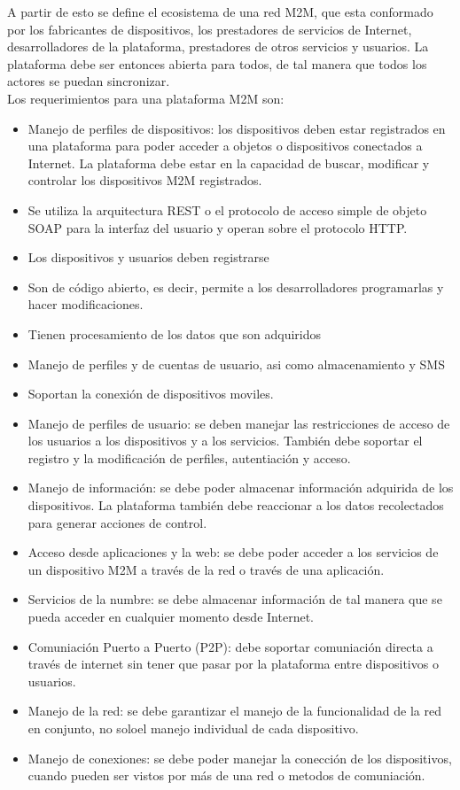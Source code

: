 \documentclass[journal]{IEEEtran}
\begin{document}
A partir de esto se define el ecosistema de una red M2M, que esta conformado por los fabricantes de dispositivos, los prestadores de servicios de Internet, desarrolladores de la plataforma, prestadores de otros servicios y usuarios. La plataforma debe ser entonces abierta para todos, de tal manera que todos los actores se puedan sincronizar.\\

Los requerimientos para una plataforma M2M son:
\begin{itemize}

\item Manejo de perfiles de dispositivos: los dispositivos deben estar registrados en una plataforma para poder acceder a objetos o dispositivos conectados a Internet. La plataforma debe estar en la capacidad de buscar, modificar y controlar los dispositivos M2M registrados.

\item Se utiliza la arquitectura REST o el protocolo de acceso simple de objeto SOAP para la interfaz del usuario y operan sobre el protocolo HTTP.
\item Los dispositivos y usuarios deben registrarse
\item Son de c\'odigo abierto, es decir, permite a los desarrolladores programarlas y hacer modificaciones.
\item Tienen procesamiento de los datos que son adquiridos
\item Manejo de perfiles y de cuentas de usuario, asi como almacenamiento y SMS
\item Soportan la conexi\'on de dispositivos moviles.


\item Manejo de perfiles de usuario: se deben manejar las restricciones de acceso de los usuarios a los dispositivos y a los servicios. Tambi\'en debe soportar el registro y la modificaci\'on de perfiles, autentiaci\'on y acceso.
\item Manejo de informaci\'on: se debe poder almacenar informaci\'on adquirida de los dispositivos. La plataforma tambi\'en debe reaccionar a los datos recolectados para generar acciones de control.
\item Acceso desde aplicaciones y la web: se debe poder acceder a los servicios de un dispositivo M2M  a trav\'es de la red o trav\'es de una aplicaci\'on.
\item Servicios de la numbre: se debe almacenar informaci\'on de tal manera que se pueda acceder en cualquier momento desde Internet.
\item Comuniaci\'on Puerto a Puerto (P2P): debe soportar comuniaci\'on directa a trav\'es de internet sin tener que pasar por la plataforma entre dispositivos o usuarios.
\item Manejo de la red: se debe garantizar el manejo de la funcionalidad de la red en conjunto, no soloel manejo individual de cada dispositivo.
\item Manejo de conexiones: se debe poder manejar la conecci\'on de los dispositivos, cuando pueden ser vistos por m\'as de una red o metodos de comuniaci\'on.

\end{itemize}
\end{document}
